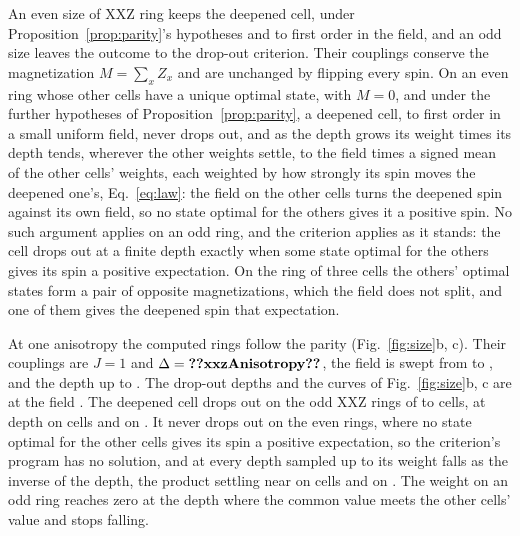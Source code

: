 \documentclass[aps,prd,reprint,superscriptaddress]{revtex4-2}
\begin{document}
An even size of XXZ ring keeps the deepened cell, under Proposition~\ref{prop:parity}'s hypotheses and to first order in the field, and an odd size leaves the outcome to the drop-out criterion. Their couplings conserve the magnetization $M = \sum_x Z_x$ and are unchanged by flipping every spin. On an even ring whose other cells have a unique optimal state, with $M = 0$, and under the further hypotheses of Proposition~\ref{prop:parity}, a deepened cell, to first order in a small uniform field, never drops out, and as the depth grows its weight times its depth tends, wherever the other weights settle, to the field times a signed mean of the other cells' weights, each weighted by how strongly its spin moves the deepened one's, Eq.~\eqref{eq:law}: the field on the other cells turns the deepened spin against its own field, so no state optimal for the others gives it a positive spin. No such argument applies on an odd ring, and the criterion applies as it stands: the cell drops out at a finite depth exactly when some state optimal for the others gives its spin a positive expectation. On the ring of three cells the others' optimal states form a pair of opposite magnetizations, which the field does not split, and one of them gives the deepened spin that expectation.

At one anisotropy the computed rings follow the parity (Fig.~\ref{fig:size}b, c). Their couplings are $J = 1$ and $\Delta = \val{xxzAnisotropy}$, the field is swept from  to , and the depth up to . The drop-out depths and the curves of Fig.~\ref{fig:size}b, c are at the field . The deepened cell drops out on the odd XXZ rings of  to  cells, at depth  on  cells and  on . It never drops out on the even rings, where no state optimal for the other cells gives its spin a positive expectation, so the criterion's program has no solution, and at every depth sampled up to  its weight falls as the inverse of the depth, the product settling near  on  cells and  on . The weight on an odd ring reaches zero at the depth where the common value meets the other cells' value and stops falling.
\end{document}
